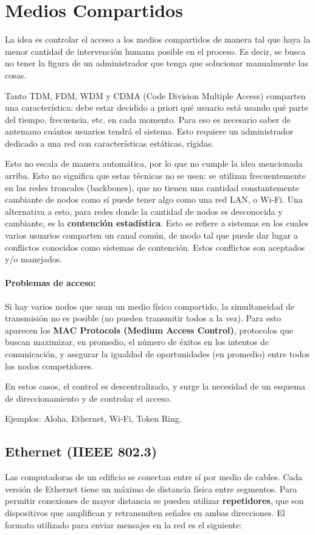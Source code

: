 \section{Medios Compartidos}
La idea es controlar el acceso a los medios compartidos de manera tal que haya la menor cantidad de intervención humana posible en el proceso. Es decir, se busca no tener la figura de un administrador que tenga que solucionar manualmente las cosas.

Tanto TDM, FDM, WDM y CDMA (Code Division Multiple Access) comparten una característica: debe estar decidido a priori qué usuario está usando qué parte del tiempo, frecuencia, etc. en cada momento. Para eso es necesario saber de antemano cuántos usuarios tendrá el sistema. Esto requiere un administrador dedicado a una red con características estáticas, rígidas.

Esto no escala de manera automática, por lo que no cumple la idea mencionada arriba. Esto no significa que estas técnicas no se usen: se utilizan frecuentemente en las redes
troncales (backbones), que no tienen una cantidad constantemente cambiante de nodos como sí puede tener algo como una red LAN, o Wi-Fi. Una alternativa a esto, para redes donde la cantidad de nodos es desconocida y cambiante, es la \textbf{contención estadística}. Esto se refiere a sistemas en los cuales varios usuarios comparten un canal común, de modo tal que puede dar lugar a conflictos conocidos como sistemas de
contención. Estos conflictos son aceptados y/o manejados.

\paragraph{Problemas de acceso:} Si hay varios nodos que usan un medio físico compartido, la simultaneidad de transmisión no es posible (no pueden transmitir todos a la vez). Para esto aparecen los \textbf{MAC Protocols (Medium Access Control)}, protocolos que buscan maximizar, en promedio, el número de éxitos en los intentos de comunicación, y asegurar la igualdad de oportunidades (en promedio) entre todos los nodos competidores.

En estos casos, el control es descentralizado, y surge la necesidad de un esquema de direccionamiento y de controlar el acceso.

Ejemplos: Aloha, Ethernet, Wi-Fi, Token Ring.

\subsection{Ethernet (IIEEE 802.3)}
Las computadoras de un edificio se conectan entre sí por medio de cables. Cada versión de Ethernet tiene un máximo de distancia física entre segmentos. Para permitir conexiones de mayor distancia se pueden utilizar \textbf{repetidores}, que son dispositivos que amplifican y retransmiten señales en ambas direcciones.
El formato utilizado para enviar mensajes en la red es el siguiente:

